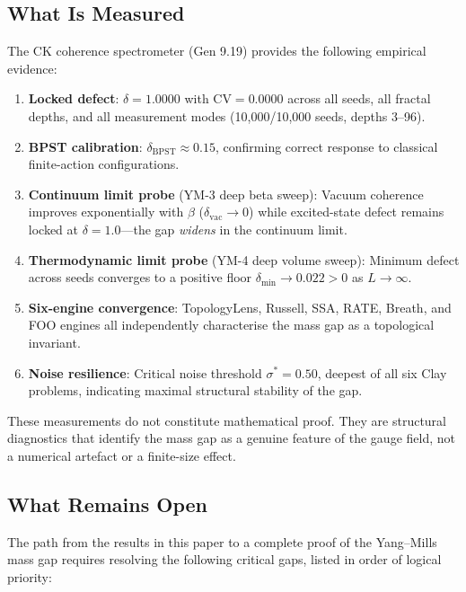 \documentclass[11pt]{article}
\begin{document}
\subsection{What Is Measured}

The CK coherence spectrometer (Gen 9.19) provides the following
empirical evidence:
\begin{enumerate}
  \item \textbf{Locked defect}: $\delta = 1.0000$ with
    $\mathrm{CV} = 0.0000$ across all seeds, all fractal depths, and
    all measurement modes (10,000/10,000 seeds, depths 3--96).

  \item \textbf{BPST calibration}: $\delta_{\mathrm{BPST}} \approx 0.15$,
    confirming correct response to classical finite-action configurations.

  \item \textbf{Continuum limit probe} (YM-3 deep beta sweep):
    Vacuum coherence improves exponentially with $\beta$
    ($\delta_{\mathrm{vac}} \to 0$) while excited-state defect remains
    locked at $\delta = 1.0$---the gap \emph{widens} in the continuum limit.

  \item \textbf{Thermodynamic limit probe} (YM-4 deep volume sweep):
    Minimum defect across seeds converges to a positive floor
    $\delta_{\min} \to 0.022 > 0$ as $L \to \infty$.

  \item \textbf{Six-engine convergence}: TopologyLens, Russell, SSA,
    RATE, Breath, and FOO engines all independently characterise the
    mass gap as a topological invariant.

  \item \textbf{Noise resilience}: Critical noise threshold
    $\sigma^* = 0.50$, deepest of all six Clay problems, indicating
    maximal structural stability of the gap.
\end{enumerate}

\noindent
These measurements do not constitute mathematical proof.  They are
structural diagnostics that identify the mass gap as a genuine feature of
the gauge field, not a numerical artefact or a finite-size effect.

\subsection{What Remains Open}

The path from the results in this paper to a complete proof of the
Yang--Mills mass gap requires resolving the following critical gaps,
listed in order of logical priority:
\end{document}
